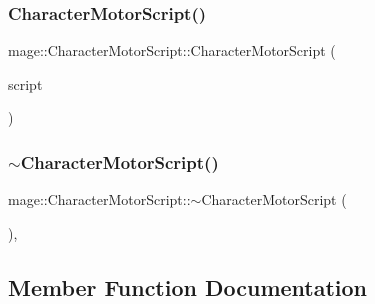 \hypertarget{classmage_1_1_character_motor_script_a04180b7c00a5c1c309fe8b1b44f6fd10}{}\label{classmage_1_1_character_motor_script_a04180b7c00a5c1c309fe8b1b44f6fd10} 
\subsubsection{\texorpdfstring{Character\+Motor\+Script()}{CharacterMotorScript()}\hspace{0.1cm}{\footnotesize\ttfamily [3/3]}}
{\footnotesize\ttfamily mage\+::\+Character\+Motor\+Script\+::\+Character\+Motor\+Script (\begin{DoxyParamCaption}\item[{\hyperlink{classmage_1_1_character_motor_script}{Character\+Motor\+Script} \&\&}]{script }\end{DoxyParamCaption})\hspace{0.3cm}{\ttfamily [default]}}

\hypertarget{classmage_1_1_character_motor_script_a97b98828d964a0ce38cc424bbf080303}{}\label{classmage_1_1_character_motor_script_a97b98828d964a0ce38cc424bbf080303} 
\subsubsection{\texorpdfstring{$\sim$\+Character\+Motor\+Script()}{~CharacterMotorScript()}}
{\footnotesize\ttfamily mage\+::\+Character\+Motor\+Script\+::$\sim$\+Character\+Motor\+Script (\begin{DoxyParamCaption}{ }\end{DoxyParamCaption})\hspace{0.3cm}{\ttfamily [virtual]}, {\ttfamily [default]}}



\subsection{Member Function Documentation}
\hypertarget{classmage_1_1_character_motor_script_a61ccbe24d365ed6b5ed1ddb4f4b342cb}{}\label{classmage_1_1_character_motor_script_a61ccbe24d365ed6b5ed1ddb4f4b342cb} 
